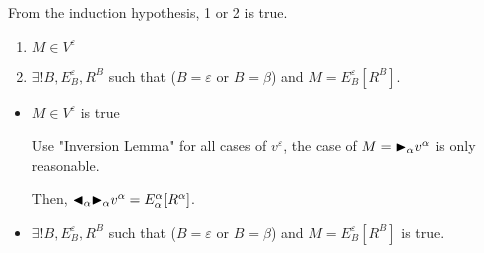 \begin{itemize}
\begin{itemize}
	      	      From the induction hypothesis, 1 or 2 is true.
	      	      \begin{enumerate}
	      	      	\item $ M \in V^\varepsilon$
	      	      	\item $\exists ! B, E^\varepsilon_B, R^B$ such that ($B = \varepsilon$ or $B = \beta$) and $M = E^\varepsilon_B[R^B]$.
	      	      \end{enumerate}
	      	      	      	      	      	      	      	      	      	      	      	      	      	      	      	      	      	      	      	      		      	      	      	      	      	      	      	      
	      	      \begin{itemize}
	      	      	\item $ M \in V^\varepsilon$ is true
	      	      	      	      	      	      	      	      	      	      	      	      	      	      	      	      	      	      	      	      	      	      	      	      	      	      	      	      	      	      		      	      	      	      	      	      	      	      	      	      	      	      
	      	      	      Use "Inversion Lemma" for all cases of $v^\varepsilon$, the case of $ M = {\mathop{\blacktriangleright}}_\alpha v^\alpha $ is only reasonable.
	      	      	      	      	      	      	      	      	      	      	      	      	      	      	      	      	      	      	      	      	      	      	      	      	      	      	      	      	      	      		      	      	      	      	      	      	      	      	      	      	      	      
	      	      	      Then, ${\mathop{\blacktriangleleft}}_\alpha {\mathop{\blacktriangleright}}_\alpha v^\alpha = E^\alpha_\alpha [R^\alpha]$.
	      	      	      	      	      	      	      	      	      	      	      	      	      	      	      	      	      	      	      	      	      	      	      	      	      	      	      	      	      	      		      	      	      	      	      	      	      	      	      	      	      	      
	      	      	\item $\exists ! B, E^\varepsilon_B, R^B$ such that ($B = \varepsilon$ or $B = \beta$) and $M = E^\varepsilon_B[R^B]$ is true.
	      	      	      	      	      	      	      	      	      	      	      	      	      	      	      	      	      	      	      	      	      	      	      	      	      	      	      	      	      	      		      	      	      	      	      	      	      	      	      	      	      	      

\end{itemize}
\end{itemize}
\end{itemize}
